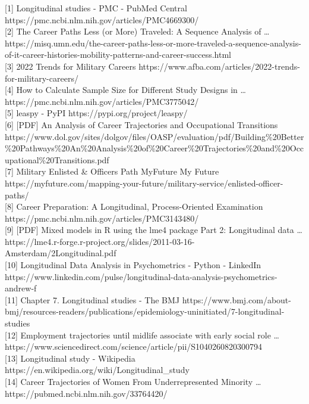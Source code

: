 \documentclass[./main.tex]{subfiles}
\begin{document}
{[}1{]} Longitudinal studies - PMC - PubMed Central
https://pmc.ncbi.nlm.nih.gov/articles/PMC4669300/\\
{[}2{]} The Career Paths Less (or More) Traveled: A Sequence Analysis of
\ldots{}
https://misq.umn.edu/the-career-paths-less-or-more-traveled-a-sequence-analysis-of-it-career-histories-mobility-patterns-and-career-success.html\\
{[}3{]} 2022 Trends for Military Careers
https://www.afba.com/articles/2022-trends-for-military-careers/\\
{[}4{]} How to Calculate Sample Size for Different Study Designs in
\ldots{} https://pmc.ncbi.nlm.nih.gov/articles/PMC3775042/\\
{[}5{]} leaspy - PyPI https://pypi.org/project/leaspy/\\
{[}6{]} {[}PDF{]} An Analysis of Career Trajectories and Occupational
Transitions
https://www.dol.gov/sites/dolgov/files/OASP/evaluation/pdf/Building\%20Better\%20Pathways\%20An\%20Analysis\%20of\%20Career\%20Trajectories\%20and\%20Occupational\%20Transitions.pdf\\
{[}7{]} Military Enlisted \& Officers Path \textbar{} MyFuture
\textbar{} My Future
https://myfuture.com/mapping-your-future/military-service/enlisted-officer-paths/\\
{[}8{]} Career Preparation: A Longitudinal, Process-Oriented Examination
https://pmc.ncbi.nlm.nih.gov/articles/PMC3143480/\\
{[}9{]} {[}PDF{]} Mixed models in R using the lme4 package Part 2:
Longitudinal data \ldots{}
https://lme4.r-forge.r-project.org/slides/2011-03-16-Amsterdam/2Longitudinal.pdf\\
{[}10{]} Longitudinal Data Analysis in Psychometrics - Python - LinkedIn
https://www.linkedin.com/pulse/longitudinal-data-analysis-psychometrics-andrew-f\\
{[}11{]} Chapter 7. Longitudinal studies - The BMJ
https://www.bmj.com/about-bmj/resources-readers/publications/epidemiology-uninitiated/7-longitudinal-studies\\
{[}12{]} Employment trajectories until midlife associate with early
social role \ldots{}
https://www.sciencedirect.com/science/article/pii/S1040260820300794\\
{[}13{]} Longitudinal study - Wikipedia
https://en.wikipedia.org/wiki/Longitudinal\_study\\
{[}14{]} Career Trajectories of Women From Underrepresented Minority
\ldots{} https://pubmed.ncbi.nlm.nih.gov/33764420/\\
\end{document}
